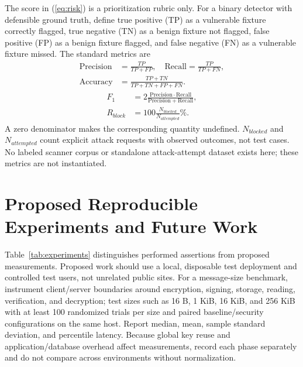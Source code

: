 \documentclass[conference]{IEEEtran}
\begin{document}
The score in (\ref{eq:risk}) is a prioritization rubric only. For a binary detector with defensible ground truth, define true positive (TP) as a vulnerable fixture correctly flagged, true negative (TN) as a benign fixture not flagged, false positive (FP) as a benign fixture flagged, and false negative (FN) as a vulnerable fixture missed. The standard metrics are
\begin{equation}
\begin{aligned}
\mathrm{Precision}&=\frac{TP}{TP+FP},\quad \mathrm{Recall}=\frac{TP}{TP+FN},\\
\mathrm{Accuracy}&=\frac{TP+TN}{TP+TN+FP+FN}.
\end{aligned}
\label{eq:metrics}
\end{equation}
\begin{equation}
\begin{aligned}
F_1&=2\frac{\mathrm{Precision}\cdot\mathrm{Recall}}{\mathrm{Precision}+\mathrm{Recall}},\\
R_{block}&=100\frac{N_{blocked}}{N_{attempted}}\%.
\end{aligned}
\label{eq:f1}
\end{equation}
A zero denominator makes the corresponding quantity undefined. $N_{blocked}$ and $N_{attempted}$ count explicit attack requests with observed outcomes, not test cases. No labeled scanner corpus or standalone attack-attempt dataset exists here; these metrics are not instantiated.

\section{Proposed Reproducible Experiments and Future Work}
Table~\ref{tab:experiments} distinguishes performed assertions from proposed measurements. Proposed work should use a local, disposable test deployment and controlled test users, not unrelated public sites. For a message-size benchmark, instrument client/server boundaries around encryption, signing, storage, reading, verification, and decryption; test sizes such as 16 B, 1 KiB, 16 KiB, and 256 KiB with at least 100 randomized trials per size and paired baseline/security configurations on the same host. Report median, mean, sample standard deviation, and percentile latency. Because global key reuse and application/database overhead affect measurements, record each phase separately and do not compare across environments without normalization.
\end{document}
